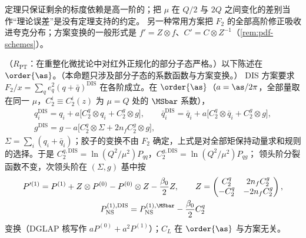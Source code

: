 \noindent
定理只保证剩余的标度依赖是高一阶的；把 $\mu$ 在 $Q/2$ 与 $2Q$ 之间变化的差别当作“理论误差”是没有定理支持的约定。
另一种常用方案把 $F_2$ 的全部高阶修正吸收进夸克分布；方案变换的一般形式是 $f'=Z\otimes f$、$C'=C\otimes Z^{-1}$（\cref{rem:pdf-schemes}）。

\begin{proposition}\label{prop:disall-dis-scheme}
（$R_{\mathrm{PT}}$：在重整化微扰论中对红外正规化的部分子态严格。）以下陈述在 $\order{\as}$。（本命题只涉及部分子态的系数函数与方案变换。）
DIS 方案要求 $F_2/x=\sum_qe_q^2(q+\bar q)^{\mathrm{DIS}}$ 在各阶成立。在 $\order{\as}$（$a=\as/2\pi$，全部量取在同一 $\mu$，$C_2^i\equiv C_2^i(z)$ 为 $\mu=Q$ 处的 $\MSbar$ 系数），
\begin{equation}\label{eq:disall-dis-scheme}
\begin{gathered}
q_i^{\mathrm{DIS}}=q_i+a\big[C_2^q\otimes q_i+C_2^g\otimes g\big],\qquad \bar q_i^{\mathrm{DIS}}=\bar q_i+a\big[C_2^q\otimes\bar q_i+C_2^g\otimes g\big],\\
g^{\mathrm{DIS}}=g-a\big[C_2^q\otimes\Sigma+2n_fC_2^g\otimes g\big],   %
\end{gathered}
\end{equation}
$\Sigma=\sum_i(q_i+\bar q_i)$；胶子的变换不由 $F_2$ 确定，上式是对全部矩保持动量求和规则的选择。于是 $C_2^{q,\mathrm{DIS}}=\ln(Q^2/\mu^2)P_{qq}$，$C_2^{g,\mathrm{DIS}}=\ln(Q^2/\mu^2)P_{qg}$；
领头阶分裂函数不变，次领头阶在 $(\Sigma,g)$ 基中按
\begin{equation}\label{eq:disall-P1}
\begin{gathered}
P'^{(1)}=P^{(1)}+Z\otimes P^{(0)}-P^{(0)}\otimes Z-\frac{\beta_0}2Z,\qquad Z=\begin{pmatrix}C_2^q&2n_fC_2^g\\-C_2^q&-2n_fC_2^g\end{pmatrix},\\
P^{(1),\mathrm{DIS}}_{\mathrm{NS}}=P^{(1),\MSbar}_{\mathrm{NS}}-\frac{\beta_0}2C_2^q   %
\end{gathered}
\end{equation}
变换（DGLAP 核写作 $aP^{(0)}+a^2P^{(1)}$）；$C_L$ 在 $\order{\as}$ 与方案无关。
\end{proposition}

